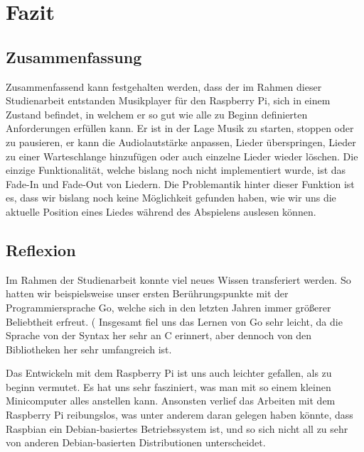 
\chapter{Fazit}

\section{Zusammenfassung}
Zusammenfassend kann festgehalten werden, dass der im Rahmen dieser
Studienarbeit entstanden Musikplayer für den Raspberry Pi, sich in einem
Zustand befindet, in welchem er so gut wie alle zu Beginn definierten
Anforderungen erfüllen kann. Er ist in der Lage Musik zu starten, stoppen oder
zu pausieren, er kann die Audiolautstärke anpassen, Lieder überspringen, Lieder
zu einer Warteschlange hinzufügen oder auch einzelne Lieder wieder löschen. Die
einzige Funktionalität, welche bislang noch nicht implementiert wurde, ist das
Fade-In und Fade-Out von Liedern. Die Problemantik hinter dieser Funktion ist
es, dass wir bislang noch keine Möglichkeit gefunden haben, wie wir uns die
aktuelle Position eines Liedes während des Abspielens auslesen können. 


\section{Reflexion}
Im Rahmen der Studienarbeit konnte viel neues Wissen transferiert werden. So
hatten wir beispielsweise unser ersten Berührungspunkte mit der
Programmiersprache Go, welche sich in den letzten Jahren immer größerer
Beliebtheit erfreut. (%
Insgesamt fiel uns das Lernen von Go sehr leicht, da die Sprache von der Syntax
her sehr an C erinnert, aber dennoch von den Bibliotheken her sehr umfangreich
ist. \newline

Das Entwickeln mit dem Raspberry Pi ist uns auch leichter gefallen, als zu
beginn vermutet. Es hat uns sehr fasziniert, was man mit so einem kleinen
Minicomputer alles anstellen kann. Ansonsten verlief das Arbeiten mit dem
Raspberry Pi reibungslos, was unter anderem daran gelegen haben könnte, dass
Raspbian ein Debian-basiertes Betriebssystem ist, und so sich nicht all zu sehr
von anderen Debian-basierten Distributionen unterscheidet.  \newline

